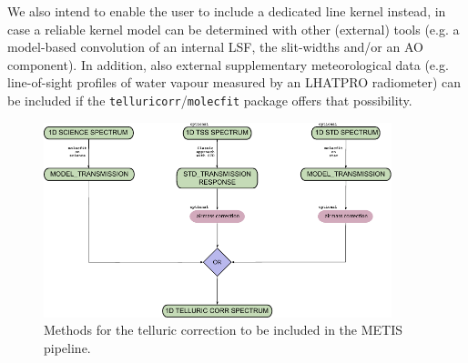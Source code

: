 We also intend to enable the user to include a dedicated line kernel instead, in case a reliable kernel model can be determined with other (external) tools (e.g. a model-based convolution of an internal \ac{LSF}, the slit-widths and/or an \ac{AO} component). In addition, also external supplementary meteorological data (e.g. line-of-sight profiles of water vapour measured by an \ac{LHATPRO} radiometer) can be included if the \texttt{telluricorr}/\texttt{molecfit} package offers that possibility.
\begin{figure}[ht]
  \centering
  \includegraphics[width=0.9\textwidth]{figures/tell_corr_methods.pdf}
    \caption[Methods for the telluric correction to be included in the METIS pipeline]{%
        Methods for the telluric correction to be included in the \ac{METIS} pipeline.}
  \label{Fig:tellcorrmethods}
\end{figure}
